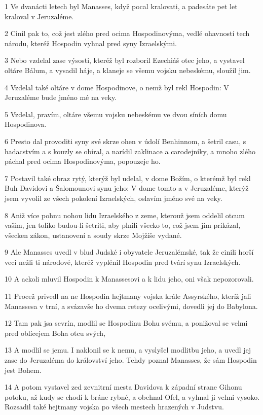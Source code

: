 \par 1 Ve dvanácti letech byl Manasses, když pocal kralovati, a padesáte pet let kraloval v Jeruzaléme.
\par 2 Cinil pak to, což jest zlého pred ocima Hospodinovýma, vedlé ohavností tech národu, kteréž Hospodin vyhnal pred syny Izraelskými.
\par 3 Nebo vzdelal zase výsosti, kteréž byl rozboril Ezechiáš otec jeho, a vystavel oltáre Bálum, a vysadil háje, a klaneje se všemu vojsku nebeskému, sloužil jim.
\par 4 Vzdelal také oltáre v dome Hospodinove, o nemž byl rekl Hospodin: V Jeruzaléme bude jméno mé na veky.
\par 5 Vzdelal, pravím, oltáre všemu vojsku nebeskému ve dvou síních domu Hospodinova.
\par 6 Presto dal provoditi syny své skrze ohen v údolí Benhinnom, a šetril casu, s hadacstvím a s kouzly se obíral, a narídil zaklinace a carodejníky, a mnoho zlého páchal pred ocima Hospodinovýma, popouzeje ho.
\par 7 Postavil také obraz rytý, kterýž byl udelal, v dome Božím, o kterémž byl rekl Buh Davidovi a Šalomounovi synu jeho: V dome tomto a v Jeruzaléme, kterýž jsem vyvolil ze všech pokolení Izraelských, oslavím jméno své na veky.
\par 8 Aniž více pohnu nohou lidu Izraelského z zeme, kterouž jsem oddelil otcum vašim, jen toliko budou-li šetriti, aby plnili všecko to, což jsem jim prikázal, všecken zákon, ustanovení a soudy skrze Mojžíše vydané.
\par 9 Ale Manasses uvedl v blud Judské i obyvatele Jeruzalémské, tak že cinili horší veci nežli ti národové, kteréž vyplénil Hospodin pred tvárí synu Izraelských.
\par 10 A ackoli mluvil Hospodin k Manassesovi a k lidu jeho, oni však nepozorovali.
\par 11 Procež privedl na ne Hospodin hejtmany vojska krále Assyrského, kteríž jali Manassesa v trní, a svázavše ho dvema retezy ocelivými, dovedli jej do Babylona.
\par 12 Tam pak jsa sevrín, modlil se Hospodinu Bohu svému, a ponižoval se velmi pred oblícejem Boha otcu svých,
\par 13 A modlil se jemu. I naklonil se k nemu, a vyslyšel modlitbu jeho, a uvedl jej zase do Jeruzaléma do království jeho. Tehdy poznal Manasses, že sám Hospodin jest Bohem.
\par 14 A potom vystavel zed zevnitrní mesta Davidova k západní strane Gihonu potoku, až kudy se chodí k bráne rybné, a obehnal Ofel, a vyhnal ji velmi vysoko. Rozsadil také hejtmany vojska po všech mestech hrazených v Judstvu.
